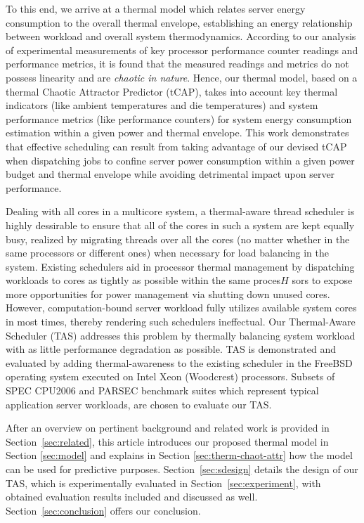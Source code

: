 \documentclass[times, 10pt,twocolumn]{IEEEtran}
\begin{document}
To this end, we arrive at a thermal model which relates server energy consumption to the overall thermal envelope,
establishing an energy relationship between workload and
overall system thermodynamics.
According to our analysis of experimental measurements of
key processor performance counter readings and performance 
metrics, it is found that the measured readings and metrics
do not possess linearity and are \textit{chaotic in nature}.
Hence, our thermal model, based on a thermal Chaotic Attractor Predictor (tCAP),
takes into account key thermal indicators
(like ambient temperatures and die temperatures)
and system performance metrics (like performance counters)
for system energy consumption estimation within a given power and
thermal envelope.
This work demonstrates that effective scheduling can
result from taking advantage of our devised tCAP
when dispatching jobs to confine server power consumption
within a given power budget and thermal envelope while
avoiding detrimental impact upon server performance.

Dealing with all cores in a multicore system, 
a thermal-aware thread scheduler is highly dessirable to ensure that all of the cores in such a system
are kept equally busy, realized by migrating
threads over all the cores (no matter whether in the same processors or different ones)
when necessary for load balancing in the system.
Existing schedulers aid in processor thermal management by 
dispatching workloads to cores as tightly as possible
within the same proces$H$ sors to expose more opportunities
for power management via shutting down unused cores.  However,
computation-bound server workload fully utilizes available system
cores in most times, thereby rendering such schedulers ineffectual.
Our Thermal-Aware Scheduler (TAS) addresses this problem by 
thermally balancing system workload with as little performance degradation as possible.
TAS is demonstrated and evaluated by adding
thermal-awareness to the existing scheduler in the FreeBSD 
operating system executed on Intel Xeon (Woodcrest) processors.  
Subsets of SPEC CPU2006 and PARSEC benchmark suites which 
represent typical application server workloads,
are chosen to evaluate our TAS.

After an overview on pertinent background and related work is provided
in Section~\ref{sec:related}, this article introduces our proposed
thermal model in Section \ref{sec:model} and explains in Section
\ref{sec:therm-chaot-attr} how the model can be used for predictive
purposes.  Section~\ref{sec:sdesign} details the design of our TAS,
which is experimentally evaluated in Section~\ref{sec:experiment}, with
obtained evaluation results included and discussed as well.
Section~\ref{sec:conclusion} offers our conclusion.
\end{document}

